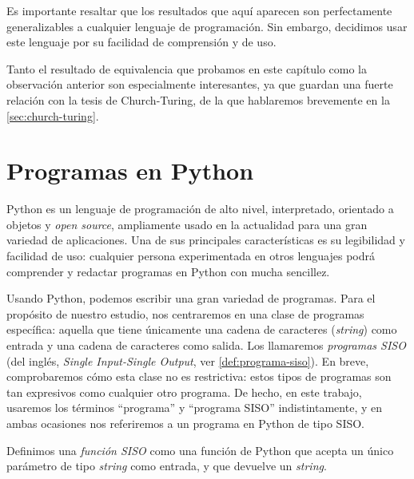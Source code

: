 Es importante resaltar que los resultados que aquí aparecen son perfectamente generalizables a cualquier lenguaje de programación. Sin embargo, decidimos usar este lenguaje por su facilidad de comprensión y de uso.

Tanto el resultado de equivalencia que probamos en este capítulo como la observación anterior son especialmente interesantes, ya que guardan una fuerte relación con la tesis de Church-Turing, de la que hablaremos brevemente en la \cref{sec:church-turing}.

\section{Programas en Python}\label{sec:programas-python}


Python \cite{Martelli2006} es un lenguaje de programación de alto nivel, interpretado, orientado a objetos y \emph{open source}, ampliamente usado en la actualidad para una gran variedad de aplicaciones. Una de sus principales características es su legibilidad y facilidad de uso: cualquier persona experimentada en otros lenguajes podrá comprender y redactar programas en Python con mucha sencillez.

Usando Python, podemos escribir una gran variedad de programas. Para el propósito de nuestro estudio, nos centraremos en una clase de programas específica: aquella que tiene únicamente una cadena de caracteres (\emph{string}) como entrada y una cadena de caracteres como salida. Los llamaremos \emph{programas SISO} (del inglés, \emph{Single Input-Single Output}, ver \cref{def:programa-siso}). \cite{MacCormick2018} En breve, comprobaremos cómo esta clase no es restrictiva: estos tipos de programas son tan expresivos como cualquier otro programa. De hecho, en este trabajo, usaremos los términos ``programa'' y ``programa SISO'' indistintamente, y en ambas ocasiones nos referiremos a un programa en Python de tipo SISO.

\begin{definicion}\label{def:funcion-siso}
Definimos una \emph{función SISO} como una función de Python que acepta un único parámetro de tipo \emph{string} como entrada, y que devuelve un \emph{string}.
\end{definicion}

